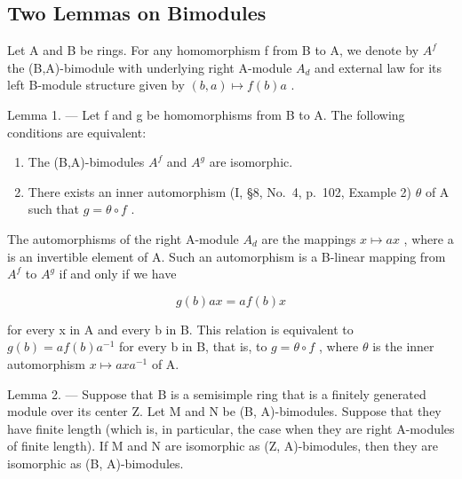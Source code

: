 \subsection{Two Lemmas on Bimodules}

Let A and B be rings. For any homomorphism f from B to A, we denote by \(A^{f}\) the (B,A)-bimodule with underlying right A-module \(A_{d}\) and external law for its left B-module structure given by \((b,a)\mapsto f(b)a\) .

Lemma 1. --- Let f and g be homomorphisms from B to A. The following conditions are equivalent:

\begin{enumerate}
\def\labelenumi{(\roman{enumi})}
\item
  The (B,A)-bimodules \(A^{f}\) and \(A^{g}\) are isomorphic.
\item
  There exists an inner automorphism (I, §8, No.~4, p.~102, Example 2) \(\theta\) of A such that \(g = \theta \circ f\) .
\end{enumerate}

The automorphisms of the right A-module \(A_{d}\) are the mappings \(x \mapsto ax\) , where a is an invertible element of A. Such an automorphism is a B-linear mapping from \(A^{f}\) to \(A^{g}\) if and only if we have

\[
g (b) a x = a f (b) x
\]

for every x in A and every b in B. This relation is equivalent to \(g(b) = af(b)a^{-1}\) for every b in B, that is, to \(g = \theta \circ f\) , where \(\theta\) is the inner automorphism \(x \mapsto axa^{-1}\) of A.

Lemma 2. --- Suppose that B is a semisimple ring that is a finitely generated module over its center Z. Let M and N be (B, A)-bimodules. Suppose that they have finite length (which is, in particular, the case when they are right A-modules of finite length). If M and N are isomorphic as (Z, A)-bimodules, then they are isomorphic as (B, A)-bimodules.

